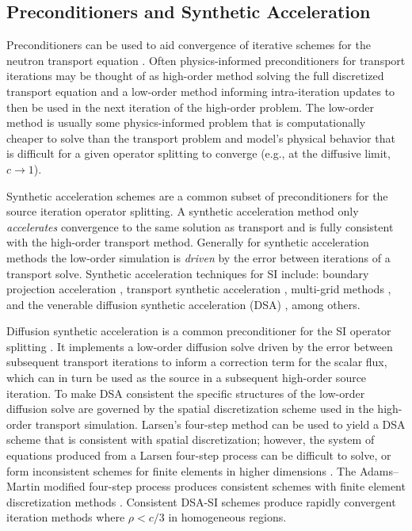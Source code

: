 \subsection{Preconditioners and Synthetic Acceleration}
\label{c2:precon}

Preconditioners can be used to aid convergence of iterative schemes for the neutron transport equation \cite{adams_fast_2002}.
Often physics-informed preconditioners for transport iterations may be thought of as high-order method solving the full discretized transport equation and a low-order method informing intra-iteration updates to then be used in the next iteration of the high-order problem.
The low-order method is usually some physics-informed problem that is computationally cheaper to solve than the transport problem and model's physical behavior that is difficult for a given operator splitting to converge (e.g., at the diffusive limit, $c\rightarrow1$).

Synthetic acceleration schemes are a common subset of preconditioners for the source iteration operator splitting.
A synthetic acceleration method only \textit{accelerates} convergence to the same solution as transport and is fully consistent with the high-order transport method.
Generally for synthetic acceleration methods the low-order simulation is \textit{driven} by the error between iterations of a transport solve.
Synthetic acceleration techniques for SI include:
boundary projection acceleration \cite{adams_boundary_1988}, 
transport synthetic acceleration \cite{ramone_1997_tsa},
multi-grid methods \cite{man1994parallel},
and the venerable diffusion synthetic acceleration (DSA) \cite{larsen_1983_dsaforsn}, among others.

Diffusion synthetic acceleration is a common preconditioner for the SI operator splitting \cite{adams_fast_2002, alcouffe_1977_dd, coale_2025_dsa}.
It implements a low-order diffusion solve driven by the error between subsequent transport iterations to inform a correction term for the scalar flux, which can in turn be used as the source in a subsequent high-order source iteration.
To make DSA consistent the specific structures of the low-order diffusion solve are governed by the spatial discretization scheme used in the high-order transport simulation.
Larsen's four-step method can be used to yield a DSA scheme that is consistent with spatial discretization; however, the system of equations produced from a Larsen four-step process can be difficult to solve, or form inconsistent schemes for finite elements in higher dimensions \cite{larsen_1982_unconDSA, larsen_1982_unconDSAte, haut_2020_dsa}. 
The Adams--Martin modified four-step process produces consistent schemes with finite element discretization methods \cite{adams_1992_dsadfe}.
Consistent DSA-SI schemes produce rapidly convergent iteration methods where $\rho<c/3$ in homogeneous regions.

